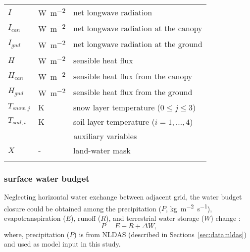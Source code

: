 \documentclass[essd]{copernicus}
\begin{document}
\begin{table}[t]
\begin{tabular}{lll}
        $I$          & \unit{W~m^{-2}}         & net longwave radiation                     \\
        $I_{can}$    & \unit{W~m^{-2}}         & net longwave radiation at the canopy       \\
        $I_{gnd}$    & \unit{W~m^{-2}}         & net longwave radiation at the ground       \\
        $H$          & \unit{W~m^{-2}}         & sensible heat flux                         \\
        $H_{can}$    & \unit{W~m^{-2}}         & sensible heat flux from the canopy         \\
        $H_{gnd}$    & \unit{W~m^{-2}}         & sensible heat flux from the ground         \\
        $T_{snow,j}$ & \unit{K}                & snow layer temperature ($0 \leq j \leq 3$) \\
        $T_{soil,i}$ & \unit{K}                & soil layer temperature ($i=1,\dots,4$)     \\
        [1pt]
        \multicolumn{3}{c}{auxiliary variables}                                             \\
        $X$          & \unit{-}                & land-water mask                            \\
        \bottomhline
    \end{tabular}
\end{table}


\subsubsection{surface water budget}

Neglecting horizontal water exchange between adjacent grid, the water budget
closure could be obtained among the precipitation ($P$,
\unit{kg~m^{-2}~s^{-1}}), evapotranspiration ($E$), runoff ($R$), and
terrestrial water storage ($W$) change \citep{zheng2020JAMES}:
\begin{equation}
    P = E + R + \Delta W \text{,}
\end{equation}
where, precipitation ($P$) is from NLDAS (described in
Sections~\ref{sec:data:nldas}) and used as model input in this study.
\end{document}
